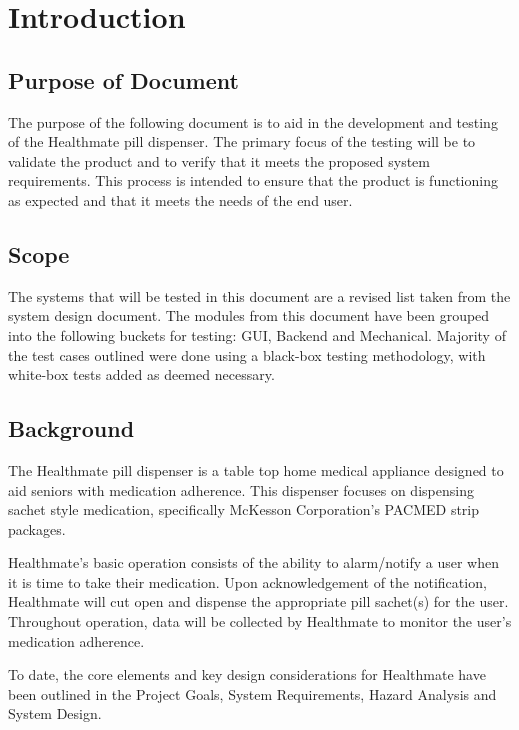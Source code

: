 \documentclass[12pt]{article}
\begin{document}
 
\pagebreak
\pagestyle{fancy} \fancyhf{}
  \cfoot{\thepage}


\pagebreak
\tableofcontents
\listoffigures
\listoftables
\pagebreak
{}
\section{Introduction}

\subsection{Purpose of Document}
The purpose of the following document is to aid in the development and testing of the Healthmate pill dispenser. The primary focus of the testing will be to validate the product and to verify that it meets the proposed system requirements. This process is intended to ensure that the product is functioning as expected and that it meets the needs of the end user.

\subsection{Scope}
The systems that will be tested in this document are a revised list taken from the system design document. The modules from this document have been grouped into the following buckets for testing: GUI, Backend and Mechanical. Majority of the test cases outlined were done using a black-box testing methodology, with white-box tests added as deemed necessary.

\subsection{Background}
The Healthmate pill dispenser is a table top home medical appliance designed to aid seniors with medication adherence. This dispenser focuses on dispensing sachet style medication, specifically McKesson Corporation's PACMED strip packages.  \par
Healthmate's basic operation consists of the ability to alarm/notify a user when it is time to take their medication. Upon acknowledgement of the notification, Healthmate will cut open and dispense the appropriate pill sachet(s) for the user. Throughout operation, data will be collected by Healthmate to monitor the user's medication adherence. \par
To date, the core elements and key design considerations for Healthmate have been outlined in the Project Goals, System Requirements, Hazard Analysis and System Design.
\end{document}
